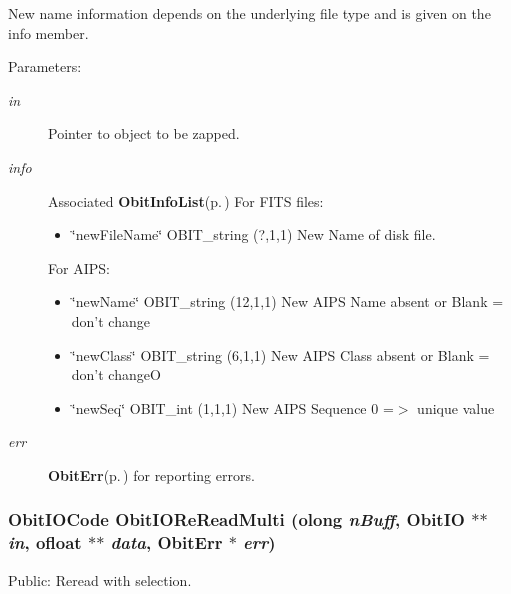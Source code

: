 New name information depends on the underlying file type and is given on the info member. \begin{Desc}
\item[Parameters:]
\begin{description}
\item[{\em in}]Pointer to object to be zapped. \item[{\em info}]Associated {\bf Obit\-Info\-List}{\rm (p.\,\pageref{structObitInfoList})} For FITS files: \begin{itemize}
\item \char`\"{}new\-File\-Name\char`\"{} OBIT\_\-string (?,1,1) New Name of disk file.\end{itemize}
For AIPS: \begin{itemize}
\item \char`\"{}new\-Name\char`\"{} OBIT\_\-string (12,1,1) New AIPS Name absent or Blank = don't change \item \char`\"{}new\-Class\char`\"{} OBIT\_\-string (6,1,1) New AIPS Class absent or Blank = don't change\-O \item \char`\"{}new\-Seq\char`\"{} OBIT\_\-int (1,1,1) New AIPS Sequence 0 =$>$ unique value \end{itemize}
\item[{\em err}]{\bf Obit\-Err}{\rm (p.\,\pageref{structObitErr})} for reporting errors. \end{description}
\end{Desc}
\subsubsection{\setlength{\rightskip}{0pt plus 5cm}Obit\-IOCode Obit\-IORe\-Read\-Multi ({\bf olong} {\em n\-Buff}, {\bf Obit\-IO} $\ast$$\ast$ {\em in}, {\bf ofloat} $\ast$$\ast$ {\em data}, {\bf Obit\-Err} $\ast$ {\em err})}\label{ObitIO_8c_a17}


Public: Reread with selection. 

